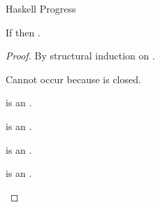 \begin{theorem}{Haskell Progress}

\label{thmpsh}

If \judeh{}{\first{\varexph}}{\vartyh} then \pshyp{\first{\varexph}}{\second{\varexph}}.

\begin{proof}

By structural induction on \first{\varexph}.


\newcommand{\psvar}{\varvarh\xspace}

\begin{case}{\psvar}

Cannot occur because \varexph is closed.

\end{case}


\newcommand{\psfabss}{\expfabss{\varvarh}{\vartyh}{\varexph}\xspace}

\begin{case}{\psfabss}

\psfabss is an \prouv.

\end{case}


\newcommand{\pstabs}{\exptabs{\tyvarh}{\varexph}\xspace}

\begin{case}{\pstabs}

\pstabs is an \prouv.

\end{case}


\newcommand{\psnum}{\expnum{\symnum}\xspace}

\begin{case}{\psnum}

\psnum is an \prouv.

\end{case}


\newcommand{\psnils}{\expnils{\vartyh}\xspace}

\begin{case}{\psnils}

\psnils is an \prouv.

\end{case}


\newcommand{\psconsh}{\expcons{\first{\varexph}}{\second{\varexph}}\xspace}


\end{proof}
\end{theorem}
